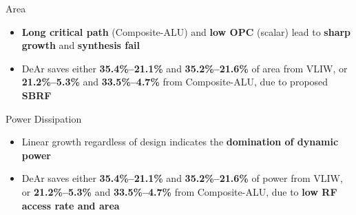 \documentclass[handout]{beamer}
\begin{document}
\begin{CJK}{UTF8}{bkai}
            \begin{frame}{Area}
                \setcounter{subfigure}{0}
                \begin{figure}[t]
                    \begin{center}
                    \end{center}
                \end{figure}
                \begin{itemize}
                    \item <2->{\textbf{Long critical path} (Composite-ALU) and \textbf{low OPC} (scalar) lead to \textbf{sharp growth} and \textbf{synthesis fail}}
                    \item <3->{DeAr saves either \textbf{35.4\%--21.1\%} and \textbf{35.2\%--21.6\%} of area from VLIW, 
                                or \textbf{21.2\%--5.3\%} and \textbf{33.5\%--4.7\%} from Composite-ALU, due to proposed \textbf{SBRF}}
                \end{itemize}
            \end{frame}

            \begin{frame}{Power Dissipation}
                \setcounter{subfigure}{0}
                \begin{figure}[t]
                    \begin{center}
                    \end{center}
                \end{figure}
                \begin{itemize}
                    \item <2->{Linear growth regardless of design indicates the \textbf{domination of dynamic power}}
                    \item <3->{DeAr saves either \textbf{35.4\%--21.1\%} and \textbf{35.2\%--21.6\%} of power from VLIW, 
                                or \textbf{21.2\%--5.3\%} and \textbf{33.5\%--4.7\%} from Composite-ALU, due to \textbf{low RF access rate and area} }
                \end{itemize}
            \end{frame}


\end{CJK}
\end{document}
